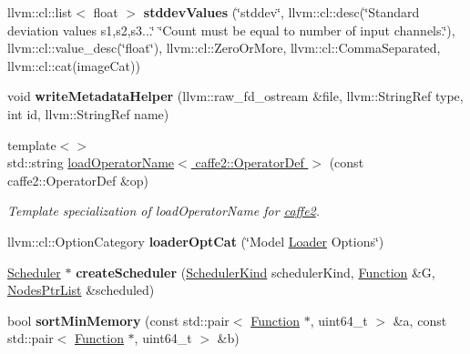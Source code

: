 \begin{DoxyCompactItemize}
\mbox{\label{namespaceglow_ab005bac048df0db93a0b0b245db7a379}} 
llvm\+::cl\+::list$<$ float $>$ {\bfseries stddev\+Values} (\char`\"{}stddev\char`\"{}, llvm\+::cl\+::desc(\char`\"{}Standard deviation values s1,s2,s3...\char`\"{} \char`\"{}Count must be equal to number of input channels.\char`\"{}), llvm\+::cl\+::value\+\_\+desc(\char`\"{}float\char`\"{}), llvm\+::cl\+::\+Zero\+Or\+More, llvm\+::cl\+::\+Comma\+Separated, llvm\+::cl\+::cat(image\+Cat))
\item 
\mbox{\label{namespaceglow_aabfb8efde0ba1a6d79ba47862d4262f7}} 
void {\bfseries write\+Metadata\+Helper} (llvm\+::raw\+\_\+fd\+\_\+ostream \&file, llvm\+::\+String\+Ref type, int id, llvm\+::\+String\+Ref name)
\item 
\mbox{\label{namespaceglow_a137433bcd25bd8810ab15790e0122d52}} 
{\footnotesize template$<$$>$ }\\std\+::string \hyperlink{namespaceglow_a137433bcd25bd8810ab15790e0122d52}{load\+Operator\+Name$<$ caffe2\+::\+Operator\+Def $>$} (const caffe2\+::\+Operator\+Def \&op)
\begin{DoxyCompactList}\small\item\em Template specialization of load\+Operator\+Name for \hyperlink{namespacecaffe2}{caffe2}. \end{DoxyCompactList}\item 
\mbox{\label{namespaceglow_a66bd78e6895c5d8403fb158dfcfdc3e1}} 
llvm\+::cl\+::\+Option\+Category {\bfseries loader\+Opt\+Cat} (\char`\"{}Model \hyperlink{classglow_1_1_loader}{Loader} Options\char`\"{})
\item 
\mbox{\label{namespaceglow_a96f58b65e79d719f8f99b784bc475ab9}} 
\hyperlink{classglow_1_1_scheduler}{Scheduler} $\ast$ {\bfseries create\+Scheduler} (\hyperlink{namespaceglow_af5b11a9c44f948717d6a886891a58b11}{Scheduler\+Kind} scheduler\+Kind, \hyperlink{classglow_1_1_function}{Function} \&G, \hyperlink{namespaceglow_a40ec79a2f9c485bfa999ed31fd0854dd}{Nodes\+Ptr\+List} \&scheduled)
\item 
\mbox{\label{namespaceglow_aa9c8b77b4e7f8471121f521d2440a8fb}} 
bool {\bfseries sort\+Min\+Memory} (const std\+::pair$<$ \hyperlink{classglow_1_1_function}{Function} $\ast$, uint64\+\_\+t $>$ \&a, const std\+::pair$<$ \hyperlink{classglow_1_1_function}{Function} $\ast$, uint64\+\_\+t $>$ \&b)

\end{DoxyCompactItemize}
